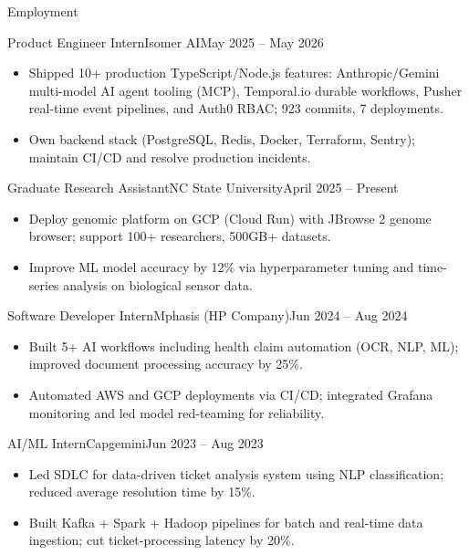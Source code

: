 \documentclass[]{mcdowellcv}
\begin{document}
\makeheader

\begin{cvsection}{Employment}
  \begin{cvsubsection}{Product Engineer Intern}{Isomer AI}{May 2025 -- May 2026}
    \begin{itemize}
      \item Shipped 10+ production TypeScript/Node.js features: Anthropic/Gemini multi-model AI agent tooling (MCP), Temporal.io durable workflows, Pusher real-time event pipelines, and Auth0 RBAC; 923 commits, 7 deployments.
      \item Own backend stack (PostgreSQL, Redis, Docker, Terraform, Sentry); maintain CI/CD and resolve production incidents.
    \end{itemize}
    \vspace{-1.5pt}
  \end{cvsubsection}

  \begin{cvsubsection}{Graduate Research Assistant}{NC State University}{April 2025 -- Present}
    \begin{itemize}
      \item Deploy genomic platform on GCP (Cloud Run) with JBrowse 2 genome browser; support 100+ researchers, 500GB+ datasets.
      \item Improve ML model accuracy by 12\% via hyperparameter tuning and time-series analysis on biological sensor data.
    \end{itemize}
    \vspace{-1.5pt}
  \end{cvsubsection}

  \begin{cvsubsection}{Software Developer Intern}{Mphasis (HP Company)}{Jun 2024 -- Aug 2024}
    \begin{itemize}
      \item Built 5+ AI workflows including health claim automation (OCR, NLP, ML); improved document processing accuracy by 25\%.
      \item Automated AWS and GCP deployments via CI/CD; integrated Grafana monitoring and led model red-teaming for reliability.
    \end{itemize}
    \vspace{-1.5pt}
  \end{cvsubsection}

  \begin{cvsubsection}{AI/ML Intern}{Capgemini}{Jun 2023 -- Aug 2023}
    \begin{itemize}
      \item Led SDLC for data-driven ticket analysis system using NLP classification; reduced average resolution time by 15\%.
      \item Built Kafka + Spark + Hadoop pipelines for batch and real-time data ingestion; cut ticket-processing latency by 20\%.
    \end{itemize}
    \vspace{-1.5pt}
  \end{cvsubsection}
\end{cvsection}
\end{document}

